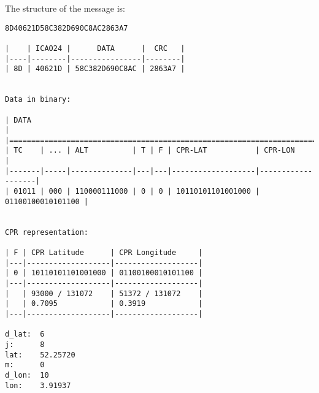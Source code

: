 The structure of the message is:

\begin{verbatim}
8D40621D58C382D690C8AC2863A7

|    | ICAO24 |      DATA      |  CRC   |
|----|--------|----------------|--------|
| 8D | 40621D | 58C382D690C8AC | 2863A7 |


Data in binary:

| DATA                                                                       |
|============================================================================|
| TC    | ... | ALT          | T | F | CPR-LAT           | CPR-LON           |
|-------|-----|--------------|---|---|-------------------|-------------------|
| 01011 | 000 | 110000111000 | 0 | 0 | 10110101101001000 | 01100100010101100 |


CPR representation:

| F | CPR Latitude      | CPR Longitude     |
|---|-------------------|-------------------|
| 0 | 10110101101001000 | 01100100010101100 |
|---|-------------------|-------------------|
|   | 93000 / 131072    | 51372 / 131072    |
|   | 0.7095            | 0.3919            |
|---|-------------------|-------------------|

d_lat:  6
j:      8
lat:    52.25720
m:      0
d_lon:  10
lon:    3.91937
\end{verbatim}
